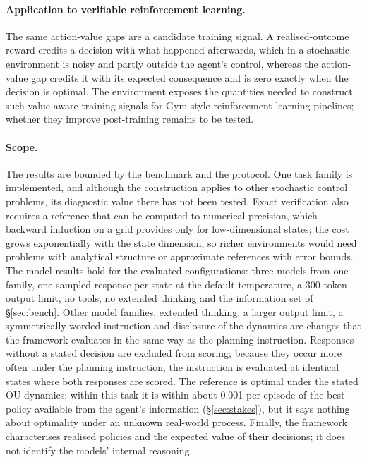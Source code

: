\documentclass[10pt,a4paper,twocolumn]{article}
\begin{document}
\paragraph{Application to verifiable reinforcement learning.} The same action-value gaps are a candidate training signal. A realised-outcome reward credits a decision with what happened afterwards, which in a stochastic environment is noisy and partly outside the agent's control, whereas the action-value gap credits it with its expected consequence and is zero exactly when the decision is optimal. The environment exposes the quantities needed to construct such value-aware training signals for Gym-style reinforcement-learning pipelines; whether they improve post-training remains to be tested.

\paragraph{Scope.} The results are bounded by the benchmark and the protocol. One task family is implemented, and although the construction applies to other stochastic control problems, its diagnostic value there has not been tested. Exact verification also requires a reference that can be computed to numerical precision, which backward induction on a grid provides only for low-dimensional states; the cost grows exponentially with the state dimension, so richer environments would need problems with analytical structure or approximate references with error bounds. The model results hold for the evaluated configurations: three models from one family, one sampled response per state at the default temperature, a 300-token output limit, no tools, no extended thinking and the information set of \S\ref{sec:bench}. Other model families, extended thinking, a larger output limit, a symmetrically worded instruction and disclosure of the dynamics are changes that the framework evaluates in the same way as the planning instruction. Responses without a stated decision are excluded from scoring; because they occur more often under the planning instruction, the instruction is evaluated at identical states where both responses are scored. The reference is optimal under the stated OU dynamics; within this task it is within about 0.001 per episode of the best policy available from the agent's information (\S\ref{sec:stakes}), but it says nothing about optimality under an unknown real-world process. Finally, the framework characterises realised policies and the expected value of their decisions; it does not identify the models' internal reasoning.
\end{document}
